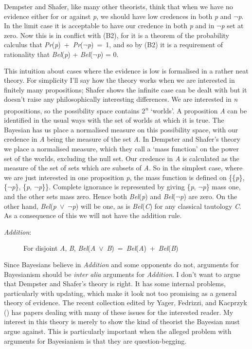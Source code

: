 \documentclass[
  11pt,
  letterpaper,
  DIV=11,
  numbers=noendperiod,
  twoside]{scrartcl}
\begin{document}
Dempster and Shafer, like many other theorists, think that when we have
no evidence either for or against \emph{p}, we should have low credences
in both \emph{p} and \({\lnot}\)\emph{p}. In the limit case it is
acceptable to have our credence in both \emph{p} and in
\({\lnot}\)\emph{p} set at zero. Now this is in conflict with (B2), for
it is a theorem of the probability calculus that
\emph{Pr}(\emph{p})~+~\emph{Pr}(\({\lnot}\)\emph{p})~=~1, and so by (B2)
it is a requirement of rationality that \emph{Bel}(\emph{p}) +
\emph{Bel}(\({\lnot}\)\emph{p}) = 0.

This intuition about cases where the evidence is low is formalised in a
rather neat theory. For simplicity I'll say how the theory works when we
are interested in finitely many propositions; Shafer shows the infinite
case can be dealt with but it doesn't raise any philosophically
interesting differences. We are interested in \emph{n} propositions, so
the possibility space contains 2\textsuperscript{\emph{n}} `worlds'. A
proposition \emph{A} can be identified in the usual ways with the set of
worlds at which it is true. The Bayesian has us place a normalised
measure on this possibility space, with our credence in \emph{A} being
the measure of the set \emph{A}. In Dempster and Shafer's theory we
place a normalised measure, which they call a `mass function' on the
power set of the worlds, excluding the null set. Our credence in
\emph{A} is calculated as the measure of the set of sets which are
subsets of \emph{A}. So in the simplest case, where we are just
interested in one proposition \emph{p}, the mass function is defined on
\{\{\emph{p}\}, \{\({\lnot}\)\emph{p}\}, \{\emph{p},
\({\lnot}\)\emph{p}\}\}. Complete ignorance is represented by giving
\{\emph{p}, \({\lnot}\)\emph{p}\} mass one, and the other sets mass
zero. Hence both \emph{Bel}(\emph{p}) and
\emph{Bel}(\({\lnot}\)\emph{p}) are zero. On the other hand,
\emph{Bel}(\emph{p}~\({\vee}\)~\({\lnot}\)\emph{p}) will be one, as is
\emph{Bel}(\emph{C}) for any classical tautology \emph{C}. As a
consequence of this we will not have the addition rule.

\begin{description}
\item[\emph{Addition}:]
For disjoint \emph{A}, \emph{B},
\emph{Bel}(\emph{A}~\({\vee}\)~\emph{B})~=~\emph{Bel}(\emph{A})~+~\emph{Bel}(\emph{B})
\end{description}

Since Bayesians believe in \emph{Addition} and some opponents do not,
arguments for Bayesianism should be \emph{inter alia} arguments for
\emph{Addition}. I don't want to argue that Dempster and Shafer's theory
is right. It has some internal problems, particularly with updating,
which make it look not too promising as a general theory of evidence.
The recent collection edited by Yager, Fedrizzi, and Kacprzyk
() has papers dealing with many of these
issues for the interested reader. My interest in this theory is merely
to show the kind of theorist the Bayesian must argue against. This is
particularly important when the alleged problem with arguments for
Bayesianism is that they are question-begging.
\end{document}
